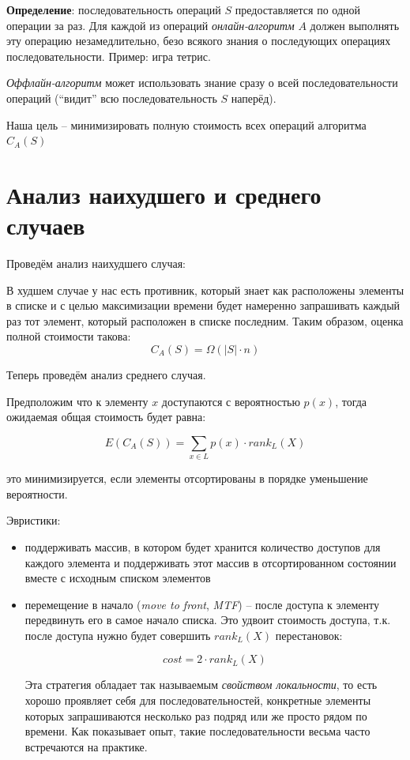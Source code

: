 \documentclass[a4paper,11pt]{article}
\begin{document}
\textbf{Определение}: последовательность операций $S$ предоставляется по одной
операции за раз. Для каждой из операций \emph{онлайн-алгоритм} $A$ должен
выполнять эту операцию незамедлительно, безо всякого знания о последующих
операциях последовательности. Пример: игра тетрис.

\emph{Оффлайн-алгоритм} может использовать знание сразу о всей
последовательности операций (``видит'' всю последовательность $S$ наперёд).

Наша цель -- минимизировать полную стоимость всех операций алгоритма $C_A(S)$

\section{Анализ наихудшего и среднего случаев}

Проведём анализ наихудшего случая:

В худшем случае у нас есть противник, который знает как расположены элементы в
списке и с целью максимизации времени будет намеренно запрашивать каждый раз тот
элемент, который расположен в списке последним. Таким образом, оценка полной
стоимости такова:
$$
C_A(S) = \Omega(|S| \cdot n)
$$

Теперь проведём анализ среднего случая.

Предположим что к элементу $x$ доступаются с вероятностью $p(x)$, тогда
ожидаемая общая стоимость будет равна:

$$
E(C_A(S)) = \sum_{x \in L} p(x) \cdot rank_L(X)
$$

это минимизируется, если элементы отсортированы в порядке уменьшение
вероятности.

Эвристики:
\begin{itemize}
\item поддерживать массив, в котором будет хранится количество доступов для
  каждого элемента и поддерживать этот массив в отсортированном состоянии вместе
  с исходным списком элементов
  
\item перемещение в начало (\emph{move to front}, \emph{MTF}) -- после доступа к
  элементу передвинуть его в самое начало списка. Это удвоит стоимость доступа,
  т.к. после доступа нужно будет совершить $rank_L(X)$ перестановок:
  
  $$
  cost = 2 \cdot rank_L(X)
  $$

  Эта стратегия обладает так называемым \emph{свойством локальности}, то есть
  хорошо проявляет себя для последовательностей, конкретные элементы которых
  запрашиваются несколько раз подряд или же просто рядом по времени. Как
  показывает опыт, такие последовательности весьма часто встречаются на
  практике.

\end{itemize}
\end{document}

